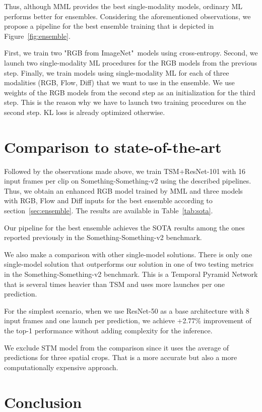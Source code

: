 \documentclass[conference]{IEEEtran}
\begin{document}
Thus, although MML provides the best single-modality models, ordinary ML performs better for ensembles. Considering the aforementioned observations, we propose a pipeline for the best ensemble training that is depicted in Figure~\ref{fig:ensemble}.

First, we train two "RGB from ImageNet"\ models using cross-entropy. Second, we launch two single-modality ML procedures for the RGB models from the previous step. Finally, we train models using single-modality ML for each of three modalities (RGB, Flow, Diff) that we want to use in the ensemble. We use weights of the RGB models from the second step as an initialization for the third step. This is the reason why we have to launch two training procedures on the second step. KL loss is already optimized otherwise.

\section{Comparison to state-of-the-art}

Followed by the observations made above, we train TSM+ResNet-101 with 16 input frames per clip on Something-Something-v2 using the described pipelines. Thus, we obtain an enhanced RGB model trained by MML and three models with RGB, Flow and Diff inputs for the best ensemble according to section~\ref{sec:ensemble}. The results are available in Table~\ref{tab:sota}.

Our pipeline for the best ensemble achieves the SOTA results among the ones reported previously in the Something-Something-v2 benchmark.

We also make a comparison with other single-model solutions. There is only one single-model solution that outperforms our solution in one of two testing metrics in the Something-Something-v2 benchmark. This is a Temporal Pyramid Network \cite{yang2020temporal} that is several times heavier than TSM and uses more launches per one prediction.

For the simplest scenario, when we use ResNet-50 as a base architecture with 8 input frames and one launch per prediction, we achieve +2.77\% improvement of the top-1 performance without adding complexity for the inference.

We exclude STM \cite{jiang2019stm} model from the comparison since it uses the average of predictions for three spatial crops. That is a more accurate but also a more computationally expensive approach.

\section{Conclusion}
\end{document}
